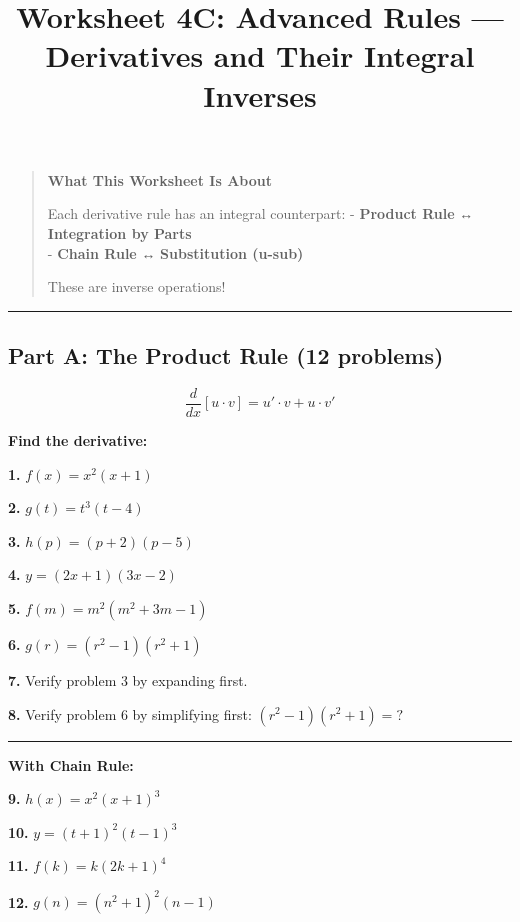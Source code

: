 \documentclass[
  11pt,
]{article}
\title{Worksheet 4C: Advanced Rules --- Derivatives and Their Integral
Inverses}
\author{}
\date{}
\begin{document}
\maketitle

\begin{quote}
\textbf{What This Worksheet Is About}

Each derivative rule has an integral counterpart: - \textbf{Product
Rule} ↔ \textbf{Integration by Parts}\\
- \textbf{Chain Rule} ↔ \textbf{Substitution (u-sub)}

These are inverse operations!
\end{quote}

\begin{center}\rule{0.5\linewidth}{0.5pt}\end{center}

\hypertarget{part-a-the-product-rule-12-problems}{%
\subsection{Part A: The Product Rule (12
problems)}\label{part-a-the-product-rule-12-problems}}

\[\frac{d}{dx}[u \cdot v] = u' \cdot v + u \cdot v'\]

\textbf{Find the derivative:}

\textbf{1.} \(f(x) = x^2(x + 1)\)

\textbf{2.} \(g(t) = t^3(t - 4)\)

\textbf{3.} \(h(p) = (p + 2)(p - 5)\)

\textbf{4.} \(y = (2x + 1)(3x - 2)\)

\textbf{5.} \(f(m) = m^2(m^2 + 3m - 1)\)

\textbf{6.} \(g(r) = (r^2 - 1)(r^2 + 1)\)

\textbf{7.} Verify problem 3 by expanding first.

\textbf{8.} Verify problem 6 by simplifying first:
\((r^2-1)(r^2+1) = ?\)

\begin{center}\rule{0.5\linewidth}{0.5pt}\end{center}

\textbf{With Chain Rule:}

\textbf{9.} \(h(x) = x^2(x + 1)^3\)

\textbf{10.} \(y = (t + 1)^2(t - 1)^3\)

\textbf{11.} \(f(k) = k(2k + 1)^4\)

\textbf{12.} \(g(n) = (n^2 + 1)^2(n - 1)\)
\end{document}
